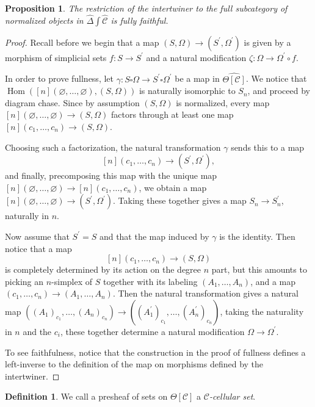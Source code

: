 \documentclass[a4paper]{article}
\numberwithin{equation}{subsection}
\theoremstyle{plain}   %
\newtheorem{prop}[equation]{Proposition}
\theoremstyle{definition}
\newtheorem{defn}[equation]{Definition}
\theoremstyle{remark}
\theoremstyle{plain}
\DeclareMathOperator{\Hom}{Hom}
\providecommand{\C}{}
\renewcommand{\C}{\ensuremath{\mathcal{C}}}
\newcommand{\cellset}{\ensuremath{\widehat{\Theta[\mathcal{C}]}}}
\newcommand{\ssetlab}{\ensuremath{\widehat{\Delta} \int \widehat{\mathcal{C}}}}
\begin{document}
\begin{prop} The restriction of the intertwiner to the full subcategory of normalized objects in \(\ssetlab\) is fully faithful.
\end{prop}
\begin{proof}
	Recall before we begin that a map \((S,\Omega)\to (S^\prime,\Omega^\prime)\) is given by a morphism of simplicial sets \(f:S\to S^\prime\) and a natural modification \(\zeta:\Omega\to \Omega^\prime\circ f\).

	In order to prove fullness, let \(\gamma:S\square\Omega\to S^\prime\square\Omega^\prime\) be a map in \(\cellset\). We notice that \(\Hom([n](\varnothing,\dots,\varnothing), (S,\Omega))\) is naturally isomorphic to \(S_n\), and proceed by diagram chase. Since by assumption \((S,\Omega)\) is normalized, every map \([n](\varnothing,\dots,\varnothing)\to (S,\Omega)\) factors through at least one map \([n](c_1,\dots,c_n)\to (S,\Omega)\).  

	Choosing such a factorization, the natural transformation \(\gamma\) sends this to a map \[[n](c_1,\dots,c_n)\to (S^\prime,\Omega^\prime),\] and finally, precomposing this map with the unique map \([n](\varnothing,\dots,\varnothing)\to [n](c_1,\dots,c_n)\), we obtain a map \([n](\varnothing,\dots,\varnothing)\to (S^\prime,\Omega^\prime)\). Taking these together gives a map \(S_n\to S^\prime_n\), naturally in \(n\).

	Now assume that \(S^\prime=S\) and that the map induced by \(\gamma\) is the identity.  Then notice that a map \[[n](c_1,\dots,c_n)\to (S,\Omega)\] is completely determined by its action on the degree \(n\) part, but this amounts to picking an \(n\)-simplex of \(S\) together with its labeling \((A_1,\dots,A_n)\), and a map \((c_1,\dots,c_n)\to (A_1,\dots,A_n)\).  Then the natural transformation gives a natural map \(((A_1)_{c_1},\dots,(A_n)_{c_n})\to ((A^\prime_1)_{c_1},\dots,(A^\prime_n)_{c_n})\), taking the naturality in \(n\) and the \(c_i\), these together determine a natural modification \(\Omega\to \Omega^\prime\).

	To see faithfulness, notice that the construction in the proof of fullness defines a left-inverse to the definition of the map on morphisms defined by the intertwiner.
\end{proof}

\begin{defn} We call a presheaf of sets on \(\Theta[\C]\) a \emph{\(\C\)-cellular set}.
\end{defn}
\end{document}
